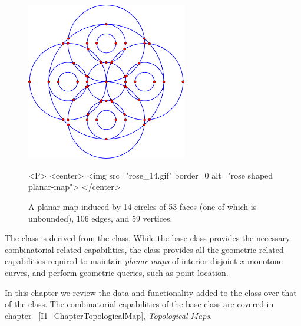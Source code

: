 \begin{figure}[h]
\begin{ccTexOnly}
\centerline{\includegraphics[width=7cm,keepaspectratio]{Planar_map/rose_14.eps}}
\end{ccTexOnly}

\caption{A planar map induced by 14 circles of 53 faces
  (one of which is unbounded), 106 edges, and 59 vertices.}
\label{PM_sec:rose_14}

\begin{ccHtmlOnly}
<P>
<center>
  <img src="rose_14.gif"  border=0 alt="rose shaped planar-map">
</center>
\end{ccHtmlOnly}
\end{figure}

The  class is derived from the
 class. While the
 base class provides the necessary
combinatorial-related capabilities, the
 class provides all the
geometric-related capabilities required to maintain {\em planar maps}
of interior-disjoint $x$-monotone curves, and perform
geometric queries, such as point location.

In this chapter we review the data and functionality added
to the  class over that of the 
 class. The combinatorial capabilities of
the base class are covered in chapter ~\ref{I1_ChapterTopologicalMap},
{\em Topological Maps}.

